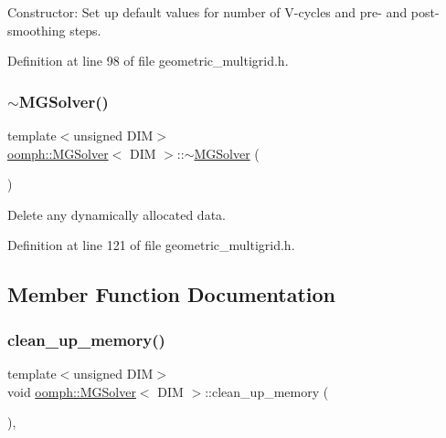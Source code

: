 Constructor\+: Set up default values for number of V-\/cycles and pre-\/ and post-\/smoothing steps. 



Definition at line 98 of file geometric\+\_\+multigrid.\+h.

\mbox{\label{classoomph_1_1MGSolver_aae6259c5553a6570841e689b63bd691d}} 
\subsubsection{\texorpdfstring{$\sim$\+M\+G\+Solver()}{~MGSolver()}}
{\footnotesize\ttfamily template$<$unsigned D\+IM$>$ \\
\hyperlink{classoomph_1_1MGSolver}{oomph\+::\+M\+G\+Solver}$<$ D\+IM $>$\+::$\sim$\hyperlink{classoomph_1_1MGSolver}{M\+G\+Solver} (\begin{DoxyParamCaption}{ }\end{DoxyParamCaption})\hspace{0.3cm}{\ttfamily [inline]}}



Delete any dynamically allocated data. 



Definition at line 121 of file geometric\+\_\+multigrid.\+h.



\subsection{Member Function Documentation}
\mbox{\label{classoomph_1_1MGSolver_a85e3e6f32b4e77d696d5b001e1428f08}} 
\subsubsection{\texorpdfstring{clean\+\_\+up\+\_\+memory()}{clean\_up\_memory()}}
{\footnotesize\ttfamily template$<$unsigned D\+IM$>$ \\
void \hyperlink{classoomph_1_1MGSolver}{oomph\+::\+M\+G\+Solver}$<$ D\+IM $>$\+::clean\+\_\+up\+\_\+memory (\begin{DoxyParamCaption}{ }\end{DoxyParamCaption})\hspace{0.3cm}{\ttfamily [inline]}, {\ttfamily [virtual]}}



